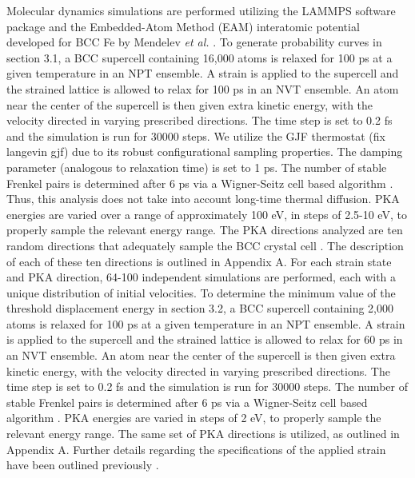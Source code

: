 \documentclass[review]{elsarticle}
\begin{document}
Molecular dynamics simulations are performed utilizing the LAMMPS \cite{plimpton1995} software package and the Embedded-Atom Method (EAM) \cite{daw1984} interatomic potential developed for BCC Fe by Mendelev \textit{et al.} \cite{mendelev2003}.  To generate probability curves in section 3.1, a BCC supercell containing 16,000 atoms is relaxed for 100 ps at a given temperature in an NPT ensemble.  A strain is applied to the supercell and the strained lattice is allowed to relax for 100 ps in an NVT ensemble.  An atom near the center of the supercell is then given extra kinetic energy, with the velocity directed in varying prescribed directions.  The time step is set to 0.2 fs and the simulation is run for 30000 steps.  We utilize the GJF thermostat \cite{gjf2013, gjf2014} (fix langevin gjf) due to its robust configurational sampling properties.  The damping parameter (analogous to relaxation time) is set to 1 ps.  The number of stable Frenkel pairs is determined after 6 ps via a Wigner-Seitz cell based algorithm \cite{hayward2010}.  Thus, this analysis does not take into account long-time thermal diffusion.  PKA energies are varied over a range of approximately 100 eV, in steps of 2.5-10 eV, to properly sample the relevant energy range.  The PKA directions analyzed are ten random directions that adequately sample the BCC crystal cell \cite{beeler2015}.  The description of each of these ten directions is outlined in Appendix A.  For each strain state and PKA direction, 64-100 independent simulations are performed, each with a unique distribution of initial velocities.  To determine the minimum value of the threshold displacement energy in section 3.2, a BCC supercell containing 2,000 atoms is relaxed for 100 ps at a given temperature in an NPT ensemble.  A strain is applied to the supercell and the strained lattice is allowed to relax for 60 ps in an NVT ensemble.  An atom near the center of the supercell is then given extra kinetic energy, with the velocity directed in varying prescribed directions.  The time step is set to 0.2 fs and the simulation is run for 30000 steps.  The number of stable Frenkel pairs is determined after 6 ps via a Wigner-Seitz cell based algorithm \cite{hayward2010}.  PKA energies are varied in steps of 2 eV, to properly sample the relevant energy range.  The same set of PKA directions is utilized, as outlined in Appendix A.  Further details regarding the specifications of the applied strain have been outlined previously \cite{beeler2015}.
\end{document}
